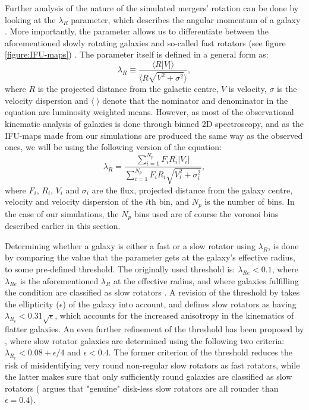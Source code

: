 \documentclass[english, oneside]{HYgradu}
\begin{document}
Further analysis of the nature of the simulated mergers' rotation can be done by looking at the $\lambda_R$ parameter, which describes the angular momentum of a galaxy \citep{Emsellem2007}. More importantly, the parameter allows us to differentiate between the aforementioned slowly rotating galaxies and so-called fast rotators (see figure \ref{figure:IFU-maps}) \citep{Emsellem2007}. The parameter itself is defined in a general form as:
\begin{equation}
\lambda_R \equiv \frac{\langle R |V| \rangle}{\langle R \sqrt{V^2 + \sigma^2} \rangle}, \label{eq:general_lambdar}
\end{equation}
where $R$ is the projected distance from the galactic centre, $V$ is velocity, $\sigma$ is the velocity dispersion and $\langle \; \rangle$ denote that the nominator and denominator in the equation are luminosity weighted means. However, as most of the observational kinematic analysis of galaxies is done through binned 2D spectroscopy, and as the IFU-maps made from our simulations are produced the same way as the observed ones, we will be using the following version of the equation:
\begin{equation}
\lambda_R = \frac{\sum^{N_p}_{i=1} F_i R_i |V_i|}{\sum^{N_p}_{i=1} F_i R_i \sqrt{V_i^2 + \sigma^2_i}}, \label{eq:binned_lambdar}
\end{equation}
where $F_i$, $R_i$, $V_i$ and $\sigma_i$ are the flux, projected distance from the galaxy centre, velocity and velocity dispersion of the $i$th bin, and $N_p$ is the number of bins. In the case of our simulations, the $N_p$ bins used are of course the voronoi bins described earlier in this section. 

Determining whether a galaxy is either a fast or a slow rotator using $\lambda_R$, is done by comparing the value that the parameter gets at the galaxy's effective radius, to some pre-defined threshold. The originally used threshold is: $\lambda_{Re} < 0.1$, where $\lambda_{Re}$ is the aforementioned $\lambda_R$ at the effective radius, and where galaxies fulfilling the condition are classified as slow rotators \citep{Emsellem2007}. A revision of the threshold by \cite{Emsellem2011} takes the ellipticity ($\epsilon$) of the galaxy into account, and defines slow rotators as having $\lambda_{R_e} < 0.31 \sqrt{\epsilon}$, which accounts for the increased anisotropy in the kinematics of flatter galaxies. An even further refinement of the threshold has been proposed by \cite{Cappellari2016}, where slow rotator galaxies are determined using the following two criteria: $\lambda_{R_e} < 0.08 + \epsilon/4$ and $\epsilon < 0.4$. The former criterion of the threshold reduces the risk of misidentifying very round non-regular slow rotators as fast rotators, while the latter makes sure that only sufficiently round galaxies are classified as slow rotators (\cite{Cappellari2016} argues that "genuine" disk-less slow rotators are all rounder than $\epsilon = 0.4$).
\end{document}
